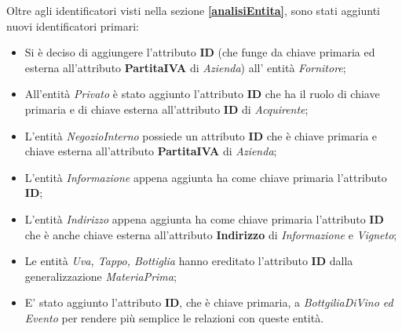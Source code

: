 Oltre agli identificatori visti nella sezione \textbf{\ref{analisiEntita}}, sono stati aggiunti nuovi identificatori primari:
\begin{itemize}
	\item Si è deciso di aggiungere l'attributo \textbf{ID} (che funge da chiave primaria ed esterna all'attributo \textbf{PartitaIVA} di \emph{Azienda}) all' entità \emph{Fornitore};
	\item All'entità \emph{Privato} è stato aggiunto l'attributo \textbf{ID} che ha il ruolo di chiave primaria e di chiave esterna all'attributo \textbf{ID} di \emph{Acquirente};
	\item L'entità \emph{NegozioInterno} possiede un attributo \textbf{ID} che è chiave primaria e chiave esterna all'attributo \textbf{PartitaIVA} di \emph{Azienda};
	\item L'entità \emph{Informazione} appena aggiunta ha come chiave primaria l'attributo \textbf{ID};
	\item L'entità \emph{Indirizzo} appena aggiunta ha come chiave primaria l'attributo \textbf{ID} che è anche chiave esterna all'attributo \textbf{Indirizzo} di \emph{Informazione} e \emph{Vigneto};
	\item Le entità \emph{Uva, Tappo, Bottiglia} hanno ereditato l'attributo \textbf{ID} dalla generalizzazione \emph{MateriaPrima};
	\item E' stato aggiunto l'attributo \textbf{ID}, che è chiave primaria, a \emph{BottgiliaDiVino ed Evento} per rendere più semplice le relazioni con queste entità.
\end{itemize}